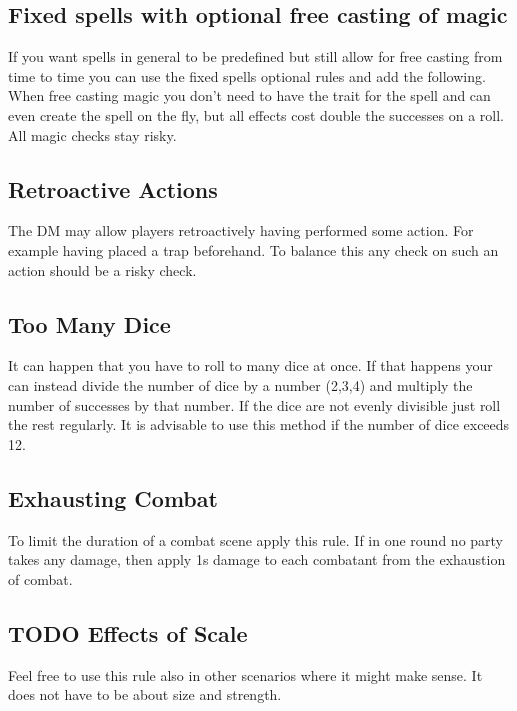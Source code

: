 \documentclass[11pt]{article}
\begin{document}
{\begin{multicols}{2}[]
\subsection{Fixed spells with optional free casting of magic}
\label{sec:org24c94cd}
If you want spells in general to be predefined but still allow for free casting from time to time you can use the fixed spells optional rules and add the following. When free casting magic you don't need to have the trait for the spell and can even create the spell on the fly, but all effects cost double the successes on a roll. All magic checks stay risky.

\subsection{Retroactive Actions}
\label{sec:org0ea948b}
The DM may allow players retroactively having performed some action. For example having placed a trap beforehand. To balance this any check on such an action should be a risky check.

\subsection{Too Many Dice}
\label{sec:org27e9a6a}
It can happen that you have to roll to many dice at once. If that happens your can instead divide the number of dice by a number (2,3,4) and multiply the number of successes by that number. If the dice are not evenly divisible just roll the rest regularly. It is advisable to use this method if the number of dice exceeds 12.

\subsection{Exhausting Combat}
\label{sec:orge1af038}
To limit the duration of a combat scene apply this rule. If in one round no party takes any damage, then apply 1s damage to each combatant from the exhaustion of combat. 

\subsection{{\bfseries\sffamily TODO} Effects of Scale}
\label{sec:org3796e00}

Feel free to use this rule also in other scenarios where it might make sense. It does not have to be about size and strength.


\end{multicols}}
\end{document}
